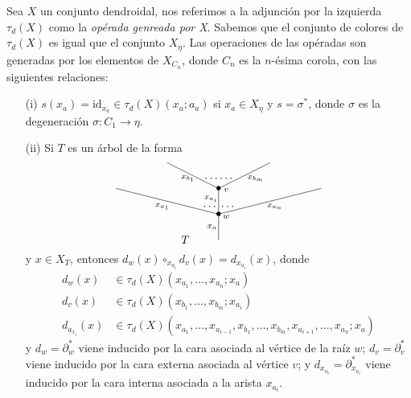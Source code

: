 \documentclass[11pt,a4paper,openright,oneside]{article}
\numberwithin{equation}{section}
\theoremstyle{definition}
\begin{document}
Sea $X$ un conjunto dendroidal, nos referimos a la adjunci\'on por la izquierda $\tau_d(X)$ como la \emph{op\'erada genreada por X}.
Sabemos que el conjunto de colores de $\tau_d(X)$ es igual que el conjunto $X_\eta$. Las operaciones de las op\'eradas son generadas por los elementos de $X_{C_n}$, donde $C_n$ es la $n$-\'esima corola, con las siguientes relaciones:
\begin{enumerate}
    \item[{\rm (i)}] $s(x_a) = \text{id}_{x_a} \in \tau_d(X)(x_a;a_a)$ si $x_a\in X_\eta$ y $s=\sigma^{*}$, donde $\sigma$ es la degeneraci\'on $\sigma\colon C_1 \to\eta$.
    \item[{\rm (ii)}] Si $T$ es un \'arbol de la forma
          \begin{equation}
              \xy
              <0.08cm, 0cm>:
              (0.0, 0.0)*{}="1"; %
              (0.0, 10.0)*=0{\bullet}="2"; %
              (-40.0, 20.0)*{}="3"; %
              (0.0, 20.0)*=0{\bullet}="4"; %
              (-20.0, 30.0)*{}="5"; %
              (20.0, 30.0)*{}="6"; %
              (40.0, 20.0)*{}="7"; %
              "1";"2" **\dir{-};
              "2";"3" **\dir{-};
              "2";"4" **\dir{-};
              "4";"5" **\dir{-};
              "4";"6" **\dir{-};
              "2";"7" **\dir{-};
              (3.0, 9.0)*=0{\scriptstyle w};
              (3.0, 19.5)*=0{\scriptstyle v};
              (-2.5, 5.0)*=0{\scriptstyle x_a};
              (-22.0, 13.0)*=0{\scriptstyle x_{a_1}};
              (-3.0, 16)*=0{\scriptstyle x_{a_i}};
              (-12.0, 24.0)*=0{\scriptstyle x_{b_1}};
              (14.5, 24.0)*=0{\scriptstyle x_{b_m}};
              (22.0, 13.0)*=0{\scriptstyle x_{a_n}};
              (0,24)*{\dots\dots};
              (-3.5,13)*{\dots};
              (3.5,13)*{\dots};
              (-13,0)*{T};
              \endxy
          \end{equation}
          y $x\in X_T$, entonces $d_w(x)\circ_{x_{a_i}}d_v(x)=d_{x_{a_i}}(x)$, donde
          \begin{align*}
              d_w(x)         & \in \tau_d(X)(x_{a_1},\dots,x_{a_n};x_a)                                                     \\
              d_v(x)         & \in \tau_d(X)(x_{b_1},\dots,x_{b_m};x_{a_i})                                                 \\
              d_{a_{x_i}}(x) & \in \tau_d(X)(x_{a_1},\dots,x_{a_{i-1}},x_{b_1},\dots,x_{b_m},x_{a_{i+1}},\dots,x_{a_n};x_a)
          \end{align*}
          y $d_w = \partial_w^{*}$ viene inducido por la cara asociada al v\'ertice de la ra\'iz $w$; $d_v = \partial_v^{*}$ viene inducido por la cara externa asociada al v\'ertice $v$; y $d_{x_{a_i}}= \partial_{x_{a_i}}^{*}$ viene inducido por la cara interna asociada a la arista $x_{a_i}$.
\end{enumerate}
\end{document}

